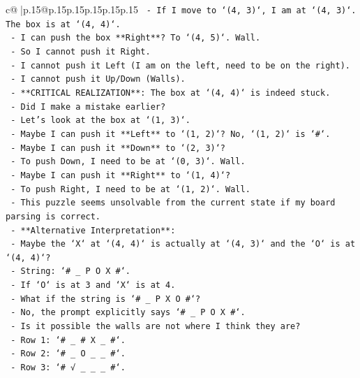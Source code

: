 \documentclass{article}
\begin{document}
{\begin{supertabular}{c@{$\;$}|p{.15\linewidth}@{}p{.15\linewidth}p{.15\linewidth}p{.15\linewidth}p{.15\linewidth}p{.15\linewidth}}
{{{\texttt{        {-} If I move to `(4, 3)`, I am at `(4, 3)`. The box is at `(4, 4)`.} \\
\texttt{        {-} I can push the box **Right**? To `(4, 5)`. Wall.} \\
\texttt{        {-} So I cannot push it Right.} \\
\texttt{        {-} I cannot push it Left (I am on the left, need to be on the right).} \\
\texttt{        {-} I cannot push it Up/Down (Walls).} \\
\texttt{        {-} **CRITICAL REALIZATION**: The box at `(4, 4)` is indeed stuck.} \\
\texttt{        {-} Did I make a mistake earlier?} \\
\texttt{        {-} Let's look at the box at `(1, 3)`.} \\
\texttt{        {-} Maybe I can push it **Left** to `(1, 2)`? No, `(1, 2)` is `\#`.} \\
\texttt{        {-} Maybe I can push it **Down** to `(2, 3)`?} \\
\texttt{          {-} To push Down, I need to be at `(0, 3)`. Wall.} \\
\texttt{        {-} Maybe I can push it **Right** to `(1, 4)`?} \\
\texttt{          {-} To push Right, I need to be at `(1, 2)`. Wall.} \\
\texttt{        {-} This puzzle seems unsolvable from the current state if my board parsing is correct.} \\
\texttt{        {-} **Alternative Interpretation**:} \\
\texttt{          {-} Maybe the `X` at `(4, 4)` is actually at `(4, 3)` and the `O` is at `(4, 4)`?} \\
\texttt{          {-} String: `\# \_ P O X \#`.} \\
\texttt{          {-} If `O` is at 3 and `X` is at 4.} \\
\texttt{          {-} What if the string is `\# \_ P X O \#`?} \\
\texttt{          {-} No, the prompt explicitly says `\# \_ P O X \#`.} \\
\texttt{          {-} Is it possible the walls are not where I think they are?} \\
\texttt{          {-} Row 1: `\# \_ \# X \_ \#`.} \\
\texttt{          {-} Row 2: `\# \_ O \_ \_ \#`.} \\
\texttt{          {-} Row 3: `\# √ \_ \_ \_ \#`.} \\
}}}
\end{supertabular}}
\end{document}
